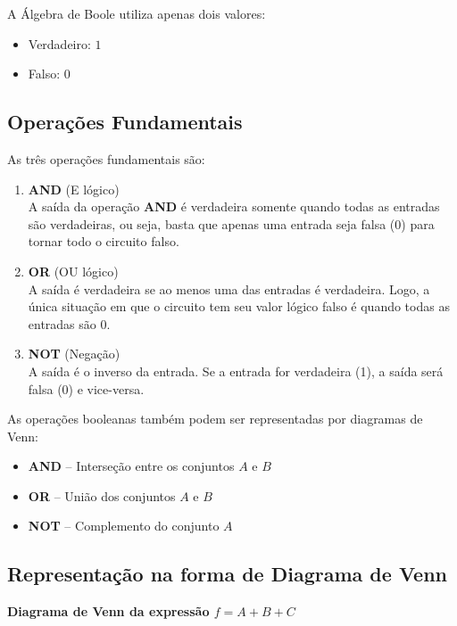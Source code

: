 \documentclass[12pt]{article}
\begin{document}
A Álgebra de Boole utiliza apenas dois valores:
\begin{itemize}
   \item Verdadeiro: $1$
   \item Falso: $0$
\end{itemize}

\subsection{Operações Fundamentais}
As três operações fundamentais são:

\begin{enumerate}
   \item \textbf{AND} (E lógico) \\
   A saída da operação \textbf{AND} é verdadeira somente quando todas as entradas são verdadeiras, ou seja, basta que apenas uma entrada seja falsa (0) para tornar todo o circuito falso. 
   \item \textbf{OR} (OU lógico) \\
   A saída é verdadeira se ao menos uma das entradas é verdadeira. Logo, a única situação em que o circuito tem seu valor lógico falso é quando todas as entradas são 0.
   \item \textbf{NOT} (Negação) \\
   A saída é o inverso da entrada. Se a entrada for verdadeira (1), a saída será falsa (0) e vice-versa.
\end{enumerate} 

\begin{tcolorbox}[mynote, title= Observação: Relação com Diagrama de Venn]
As operações booleanas também podem ser representadas por diagramas de Venn:
\begin{itemize}
   \item \textbf{AND} – Interseção entre os conjuntos $A$ e $B$
   \item \textbf{OR} – União dos conjuntos $A$ e $B$
   \item \textbf{NOT} – Complemento do conjunto $A$
\end{itemize}
\end{tcolorbox}

\vspace{0.2cm}

\subsection{Representação na forma de Diagrama de Venn} 
\begin{center}
\textbf{Diagrama de Venn da expressão $f = A + B + C$}
\end{center}
\end{document}
